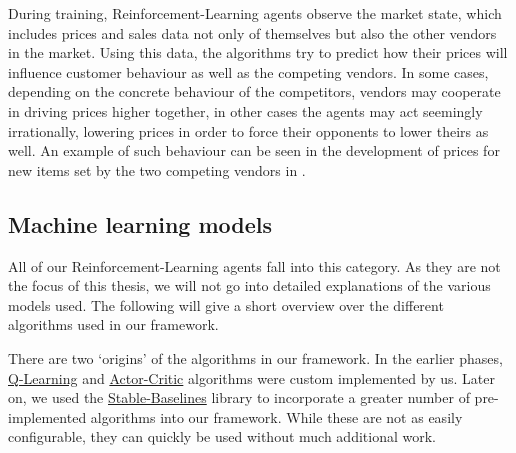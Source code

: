 During training, Reinforcement-Learning agents observe the market state, which includes prices and sales data not only of themselves but also the other vendors in the market. Using this data, the algorithms try to predict how their prices will influence customer behaviour as well as the competing vendors. In some cases, depending on the concrete behaviour of the competitors, vendors may cooperate in driving prices higher together, in other cases the agents may act seemingly irrationally, lowering prices in order to force their opponents to lower theirs as well. An example of such behaviour can be seen in the development of prices for new items set by the two competing vendors in .

\subsection*{Machine learning models}\label{subsec:MachineLearningModels}

All of our Reinforcement-Learning agents fall into this category. As they are not the focus of this thesis, we will not go into detailed explanations of the various models used. The following will give a short overview over the different algorithms used in our framework.

There are two `origins' of the algorithms in our framework. In the earlier phases, \hyperref[item:QLearning]{Q-Learning} and \hyperref[item:ActorCritic]{Actor-Critic} algorithms were custom implemented by us. Later on, we used the \hyperref[item:StableBaselines]{Stable-Baselines} library to incorporate a greater number of pre-implemented algorithms into our framework. While these are not as easily configurable, they can quickly be used without much additional work.

